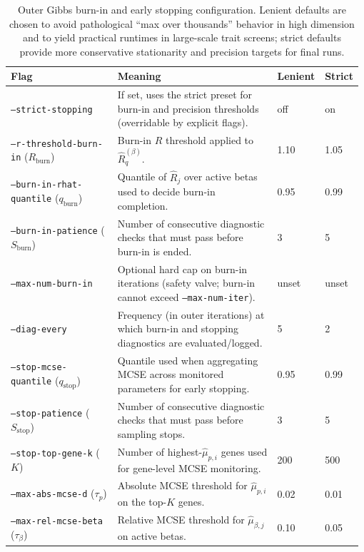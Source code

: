 \documentclass[11pt]{article}
\begin{document}
\begin{table}[t]
\centering
\small
\begin{tabular}{p{0.32\linewidth} p{0.48\linewidth} p{0.09\linewidth} p{0.09\linewidth}}
\hline
\textbf{Flag} & \textbf{Meaning} & \textbf{Lenient} & \textbf{Strict} \\
\hline
\texttt{--strict-stopping} &
If set, uses the strict preset for burn-in and precision thresholds (overridable by explicit flags). &
off & on \\
\texttt{--r-threshold-burn-in} ($R_{\mathrm{burn}}$) &
Burn-in $\widehat{R}$ threshold applied to $\widehat{R}^{(\beta)}_q$. &
1.10 & 1.05 \\
\texttt{--burn-in-rhat-quantile} ($q_{\mathrm{burn}}$) &
Quantile of $\widehat{R}_j$ over active betas used to decide burn-in completion. &
0.95 & 0.99 \\
\texttt{--burn-in-patience} ($S_{\mathrm{burn}}$) &
Number of consecutive diagnostic checks that must pass before burn-in is ended. &
3 & 5 \\
\texttt{--max-num-burn-in} &
Optional hard cap on burn-in iterations (safety valve; burn-in cannot exceed \texttt{--max-num-iter}). &
unset & unset \\
\texttt{--diag-every} &
Frequency (in outer iterations) at which burn-in and stopping diagnostics are evaluated/logged. &
5 & 2 \\
\texttt{--stop-mcse-quantile} ($q_{\mathrm{stop}}$) &
Quantile used when aggregating MCSE across monitored parameters for early stopping. &
0.95 & 0.99 \\
\texttt{--stop-patience} ($S_{\mathrm{stop}}$) &
Number of consecutive diagnostic checks that must pass before sampling stops. &
3 & 5 \\
\texttt{--stop-top-gene-k} ($K$) &
Number of highest-$\hat\mu_{p,i}$ genes used for gene-level MCSE monitoring. &
200 & 500 \\
\texttt{--max-abs-mcse-d} ($\tau_p$) &
Absolute MCSE threshold for $\hat\mu_{p,i}$ on the top-$K$ genes. &
0.02 & 0.01 \\
\texttt{--max-rel-mcse-beta} ($\tau_\beta$) &
Relative MCSE threshold for $\hat\mu_{\beta,j}$ on active betas. &
0.10 & 0.05 \\
\hline
\end{tabular}
\caption{Outer Gibbs burn-in and early stopping configuration. Lenient defaults are chosen to
avoid pathological ``max over thousands'' behavior in high dimension and to yield practical runtimes
in large-scale trait screens; strict defaults provide more conservative stationarity and precision
targets for final runs.}
\label{tab:outer_gibbs_stopping_flags}
\end{table}
\end{document}
